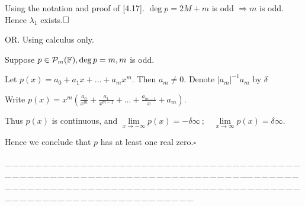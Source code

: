 \documentclass[a4paper, 11pt, UTF8]{article}
\def\Or{\large O{\footnotesize R.} }
\def\ProblemEnding{{\tiny \_\,\_\,\_\,\_\,\_\,\_\,\_\,\_\,\_\,\_\,\_\,\_\,\_\,\_\,\_\,\_\,\_\,\_\,\_\,\_\,\_\,\_\,\_\,\_\,\_\,\_\,\_\,\_\,\_\,\_\,\_\,\_\,\_\,\_\,\_\,\_\,\_\,\_\,\_\,\_\,\_\,\_\,\_\,\_\,\_\,\_\,\_\,\_\,\_\,\_\,\_\,\_\,\_\,\_\,\_\,\_\,\_\,\_\,\_\,\_\,\_\,\_\,\_\,\_\,\_\,\_\,\_\,\_\,\_\,\_\,\_\_\,\_\,\_\,\_\,\_\,\_\,\_\,\_\,\_\,\_\,\_\,\_\,\_\,\_\,\_\,\_\,\_\,\_\,\_\,\_\,\_\,\_\,\_\,\_\,\_\,\_\,\_\,\_\,\_\,\_\,\_\,\_\,\_\,\_\,\_\,\_\,\_\,\_\,\_\,\_\,\_\,\_\,\_\,\_\,\_\,\_\,\_\,\_\,\_\,\_\,\_\,\_\,\_\,\_\,\_\,\_\,\_\,\_\,\_\,\_\,\_\,\_\,\_\,\_\,\_\,\_\,\_\,\_\,\_\,\_\,\_}}
\begin{document}
\begin{large}
\par\quad
Using the notation and proof of [4.17]. $\deg p=2M+m$ is odd $\Rightarrow m$ is odd. Hence $\lambda_1$ exists.$\hfill\square$\par\vspace{6pt}\quad
\Or Using calculus only.\par\quad
Suppose $p\in\mathcal{P}_{m}({\mathbb{F}}),\deg p=m,m$ is odd.\par\quad
Let $p(x)=a_0+a_1 x+\dots+a_m x^m.$ Then $a_m\neq 0.$ Denote $\left|a_m\right|^{-1}a_m$ by $\delta$\par\vspace{3pt}\quad
Write $p(x)=x^m\left(\displaystyle\frac{a_0}{x^m}+\frac{a_1}{x^{m-1}}+\dots+\frac{a_{m-1}}{x}+a_m\right).$\par\vspace{5pt}\quad
Thus $p(x)$ is continuous, and $\lim\limits_{x\rightarrow -\infty}p(x)=-\delta\infty\,;\quad\lim\limits_{x\rightarrow \infty}p(x)=\delta\infty.$\par\quad
Hence we conclude that $p$ has at least one real zero.\quad $\square$\par
\ProblemEnding\par


\end{large}
\end{document}
